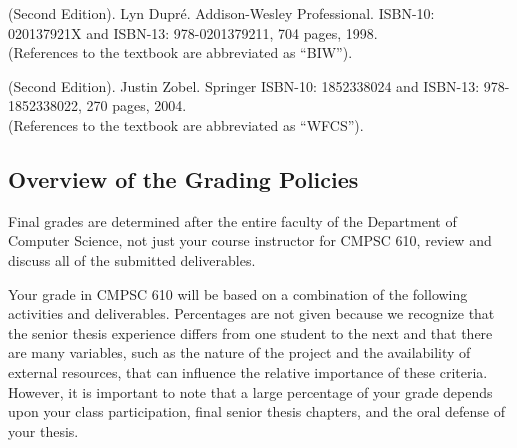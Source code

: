  (Second Edition). Lyn Dupr\'e. Addison-Wesley
Professional.  ISBN-10: 020137921X and ISBN-13: 978-0201379211, 704 pages, 1998.\\ (References to the textbook are
abbreviated as ``BIW'').

 (Second Edition). Justin Zobel. Springer ISBN-10: 1852338024 and ISBN-13:
978-1852338022, 270 pages, 2004. \\ (References to the textbook are abbreviated as ``WFCS'').

\vspace*{-.15in}
\subsection*{Overview of the Grading Policies}

Final grades are determined after the entire faculty of the Department of Computer Science, not just your course
instructor for CMPSC 610, review and discuss all of the submitted deliverables.

Your grade in CMPSC 610 will be based on a combination of the following activities and deliverables. Percentages are not
given because we recognize that the senior thesis experience differs from one student to the next and that there are many
variables, such as the nature of the project and the availability of external resources, that can influence the relative
importance of these criteria. However, it is important to note that a large percentage of your grade depends upon your
class participation, final senior thesis chapters, and the oral defense of your thesis.

\vspace*{-.05in}

